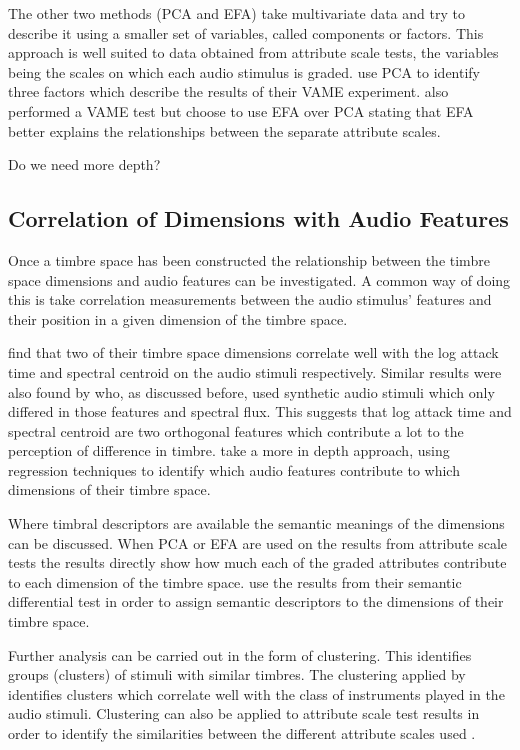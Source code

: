 		The other two methods (PCA and EFA) take multivariate data and try to describe it using a smaller set of
		variables, called components or factors. This approach is well suited to data obtained from attribute scale
		tests, the variables being the scales on which each audio stimulus is graded. \citet{kendall1993verbal1} use
		PCA to identify three factors which describe the results of their VAME experiment.
		\citet{zacharakis2012analysis} also performed a VAME test but choose to use EFA over PCA stating that EFA
		better explains the relationships between the separate attribute scales.

		\note
		{
			Do we need more depth?
		}


	\subsection{Correlation of Dimensions with Audio Features}
	\label{sec:Timbre-DimensionalityReduction-DimensionCorrelations}
		Once a timbre space has been constructed the relationship between the timbre space dimensions and audio
		features can be investigated. A common way of doing this is take correlation measurements between the audio
		stimulus' features and their position in a given dimension of the timbre space.

		\citet{mcadams1995perceptual} find that two of their timbre space dimensions correlate well with the log
		attack time and spectral centroid on the audio stimuli respectively. Similar results were also found by
		\citet{caclin2005acoustic} who, as discussed before, used synthetic audio stimuli which only differed in
		those features and spectral flux. This suggests that log attack time and spectral centroid are two
		orthogonal features which contribute a lot to the perception of difference in timbre.
		\citet{alluri2010exploring} take a more in depth approach, using regression techniques to identify which
		audio features contribute to which dimensions of their timbre space.

		Where timbral descriptors are available the semantic meanings of the dimensions can be discussed. When PCA
		or EFA are used on the results from attribute scale tests the results directly show how much each of the
		graded attributes contribute to each dimension of the timbre space. \citet{marui2005timbre} use the results
		from their semantic differential test in order to assign semantic descriptors to the dimensions of their
		timbre space.

		Further analysis can be carried out in the form of clustering. This identifies groups (clusters) of stimuli
		with similar timbres. The clustering applied by \citet{lakatos2000a} identifies clusters which correlate
		well with the class of instruments played in the audio stimuli. Clustering can also be applied to attribute
		scale test results in order to identify the similarities between the different attribute scales used
		\citep{zacharakis2011an2}.

